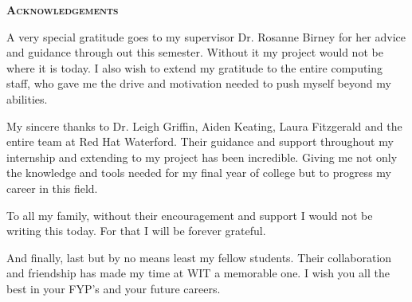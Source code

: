 \begin{center}
{\scshape\LARGE \textbf{Acknowledgements}\par}
\end{center}
\thispagestyle{empty}
\vspace{1cm}
A very special gratitude goes to my supervisor Dr. Rosanne Birney for her advice and guidance through out this semester. Without it my project would not be where it is today. I also wish to extend my gratitude to the entire computing staff, who gave me the drive and motivation needed to push myself beyond my abilities.

My sincere thanks to Dr. Leigh Griffin, Aiden Keating, Laura Fitzgerald and the entire team at Red Hat Waterford. Their guidance and support throughout my internship and extending to my project has been incredible. Giving me not only the knowledge and tools needed for my final year of college but to progress my career in this field.

To all my family, without their encouragement and support I would not be writing this today. For that I will be forever grateful.

And finally, last but by no means least my fellow students. Their collaboration and friendship has made my time at WIT a memorable one. I wish you all the best in your FYP's and your future careers. 
